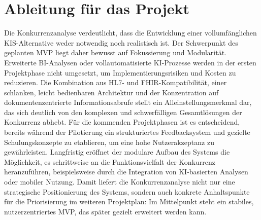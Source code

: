 \section{Ableitung für das Projekt}
Die Konkurrenzanalyse verdeutlicht, dass die Entwicklung einer vollumfänglichen KIS-Alternative weder notwendig noch realistisch ist. Der Schwerpunkt des geplanten MVP liegt daher bewusst auf Fokussierung und Modularität. Erweiterte BI-Analysen oder vollautomatisierte KI-Prozesse werden in der ersten Projektphase nicht umgesetzt, um Implementierungsrisiken und Kosten zu reduzieren. Die Kombination aus HL7- und FHIR-Kompatibilität, einer schlanken, leicht bedienbaren Architektur und der Konzentration auf dokumentenzentrierte Informationsabrufe stellt ein Alleinstellungsmerkmal dar, das sich deutlich von den komplexen und schwerfälligen Gesamtlösungen der Konkurrenz abhebt.
Für die kommenden Projektphasen ist es entscheidend, bereits während der Pilotierung ein strukturiertes Feedbacksystem und gezielte Schulungskonzepte zu etablieren, um eine hohe Nutzerakzeptanz zu gewährleisten. Langfristig eröffnet der modulare Aufbau des Systems die Möglichkeit, es schrittweise an die Funktionsvielfalt der Konkurrenz heranzuführen, beispielsweise durch die Integration von KI-basierten Analysen oder mobiler Nutzung. Damit liefert die Konkurrenzanalyse nicht nur eine strategische Positionierung des Systems, sondern auch konkrete Anhaltspunkte für die Priorisierung im weiteren Projektplan: Im Mittelpunkt steht ein stabiles, nutzerzentriertes MVP, das später gezielt erweitert werden kann.
